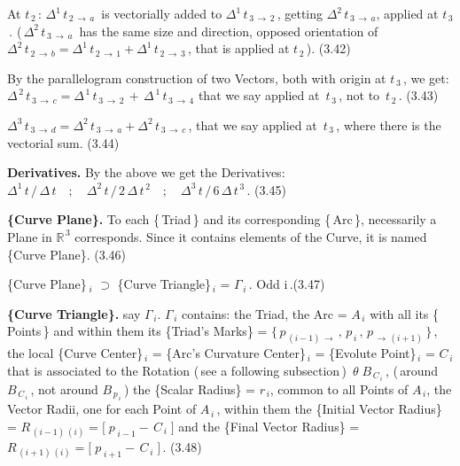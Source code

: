 \documentclass[12pt]{article} %
\begin{document}
\noindent At $t_{\,2}$\,:\; $\Delta^{1}\,t_{\,2\,\to\, a}$\, is vectorially added to $\Delta^{1}\,t_{\,3\,\to\,2}$\,, getting $\Delta^{2}\,t_{\,3\,\to\,a}$, applied at $t_{\,3}$\,.\; (\,$\Delta^{2}\,t_{\,3\,\to\,a}$\, has the same size and direction, opposed orientation of $\Delta^{2}\,t_{\,2\,\to\,b} = \Delta^{1}\,t_{\,2\,\to\,1} + \Delta^{1}\,t_{\,2\,\to\,3}$\,, that is applied at $t_{\,2}$\,). \quad (3.42)

\noindent By the parallelogram construction of two Vectors, both with origin at $t_{\,3}$\,, we get:\; $\Delta^{\,2}\,t_{\,3\, \to\, c} = \Delta^{\,1}\,t_{\,3\, \to\, 2}\, + \,\Delta^{\,1}\,t_{\,3\, \to \,4}$\; that we say applied at\, $t_{\,3}$\,, not to\, $t_{\,2}$\,. \qquad (3.43)

\noindent $\Delta^{3}\,t_{\,3\,\to\,d} = \Delta^{2}\,t_{\,3\,\to\,a} + \Delta^{2}\,t_{\,3\,\to\,c}$\,, that we say applied at\, $t_{\,3}$\,, where there is the vectorial sum. \qquad (3.44)

\noindent \textbf{Derivatives.} By the above we get the Derivatives:\\$\Delta^{1}\,t\,/\,\Delta\,t\quad;\quad\Delta^{2}\,t\,/\,2\,\Delta\,t^{\,2}\quad;\quad\Delta^{3}\,t\,/\,6\,\Delta\,t^{\,3}$\,. \qquad (3.45)

\noindent \textbf{\{Curve Plane\}.} To each \{\,Triad\,\} and its corresponding \{\,Arc\,\}, necessarily a Plane in $\mathbb{R}^{\,3}$ corresponds. Since it contains elements of the Curve, it is named \{Curve Plane\}. \qquad \qquad (3.46)

\noindent \{Curve Plane\}$_{\;i}$ $\supset$ \{Curve Triangle\}$_{\,i}$ = $\Gamma_{\,i}$\,. \qquad  Odd i\,.\qquad \qquad (3.47)

\noindent \textbf{\{Curve Triangle\}.} say $\Gamma_{\,i}$. $\Gamma_{\,i}$ contains: the Triad, the Arc = $A_{\,i}$ with all its \{\,Points\,\} and within them its \{Triad's Marks\} = $\{\,p_{\,(i-1)\,\to}\,,\,p_{\,i}\,,\,p_{\,\to\,(i+1)}\,\}$\,, the local \{Curve Center\}$_{\,i}$ = \{Arc's Curvature Center\}$_{\,i}$ = \{Evolute Point\}$_{\,i}$ = $C_{\,i}$ that is associated to the Rotation (\,see a following subsection\,)\, $\theta\;B_{\,C_{\,i}}$\,, (\,around $B_{\,C_{\,i}}$\,, not around $B_{\,p_{\,i}}$\,) the \{Scalar Radius\} = $r_{\,i}$, common to all Points of $A_{\,i}$, the Vector Radii, one for each Point of $A_{\,i}$\,, within them the \{Initial Vector Radius\} = $R_{\,(i-1)\,(i)} = \big[\; p_{\;i-1} -\, C_{\,i}\;\big]$  and the \{Final Vector Radius\} = $R_{\,(i+1)\,(i)} = \big[\;p_{\;i+1} -\, C_{\,i}\;\big]$\,. (3.48)
\end{document}
